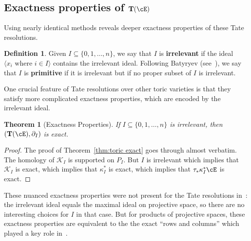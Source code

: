 \documentclass[12pt]{amsart}
\newtheorem{thm}[lemma]{Theorem}
\theoremstyle{definition}
\newtheorem{defn}[lemma]{Definition}
\newtheorem{example}[lemma]{Example}
\theoremstyle{remark}
\newcommand{\Kos}{\mathcal{K}}
\newcommand{\Tate}{{\mathbf{T}}}
\newcommand{\bF}{\mathbf F}
\begin{document}
\subsection{Exactness properties of $\Tate(\cE)$}
Using nearly identical methods reveals deeper exactness properties of these Tate resolutions.
\begin{defn}\label{defn:irr and primitive}
Given $I\subseteq \{0,1,\dots,n\}$, we say that $I$ is {\bf irrelevant} if the ideal $\langle x_i \text{ where } i\in I\rangle$ contains the irrelevant ideal.  Following Batyryev (see~\cite[p. 304]{CLS}), we say that $I$ is {\bf primitive} if it is irrelevant but if no proper subset of $I$ is irrelevant.
\end{defn}


One crucial feature of Tate resolutions over other toric varieties is that they satisfy more complicated exactness properties, which are encoded by the irrelevant ideal.
\begin{thm}[Exactness Properties]\label{thm:exactness properties}
If $I\subseteq \{0,1,\dots,n\}$ is irrelevant, then $(\Tate(\cE),\partial_I)$ is exact.
\end{thm}
\begin{proof}
The proof of Theorem~\ref{thm:toric exact} goes through almost verbatim.  The homology of $\Kos_I$ is supported on $P_I$.  But $I$ is irrelevant which implies that $\Kos_I$ is exact, which implies that $\kappa_I^*$ is exact, which implies that $\tau_*\kappa_I^*\cE$ is exact.
\end{proof}
These nuanced exactness properties were not present for the Tate resolutions in~\cite{EFS}: the irrelevant ideal equals the maximal ideal on projective space, so there are no interesting choices for $I$ in that case.  But for products of projective spaces, these exactness properties are equivalent to the the exact ``rows and columns'' which played a key role in~\cite{ees-products}.  
\end{document}
